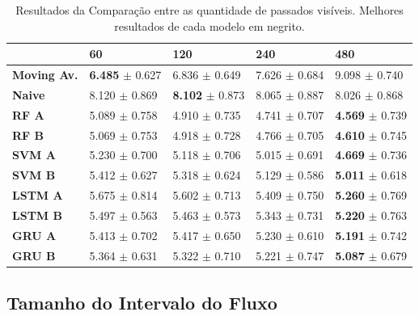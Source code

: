 \begin{table}[htbp]
    \begin{tabular*}{\linewidth}{@{\extracolsep{\fill}}lllll}
    \toprule
     & 
    \multicolumn{1}{l}{\textbf{60}} & 
    \multicolumn{1}{l}{\textbf{120}} &
    \multicolumn{1}{l}{\textbf{240}} &
    \multicolumn{1}{l}{\textbf{480}} \\
    \midrule
    \textbf{Moving Av.} & \textbf{6.485} $\pm$ 0.627 & 6.836 $\pm$ 0.649 & 7.626 $\pm$ 0.684 & 9.098 $\pm$ 0.740
    \\
    \midrule
    \textbf{Naive} & 8.120 $\pm$ 0.869 & \textbf{8.102} $\pm$ 0.873 & 8.065 $\pm$ 0.887 & 8.026 $\pm$ 0.868 
    \\
    \midrule
    \textbf{RF A} & 5.089 $\pm$ 0.758 & 4.910 $\pm$ 0.735 & 4.741 $\pm$ 0.707 & \textbf{4.569} $\pm$ 0.739 
    \\
    \midrule
    \textbf{RF B} & 5.069 $\pm$ 0.753 & 4.918 $\pm$ 0.728 & 4.766 $\pm$ 0.705 & \textbf{4.610} $\pm$ 0.745 
    \\
    \midrule
    \textbf{SVM A} & 5.230 $\pm$ 0.700 & 5.118 $\pm$ 0.706 & 5.015 $\pm$ 0.691 & \textbf{4.669} $\pm$ 0.736 
    \\
    \midrule
    \textbf{SVM B} & 5.412 $\pm$ 0.627 & 5.318 $\pm$ 0.624 & 5.129 $\pm$ 0.586 & \textbf{5.011} $\pm$ 0.618 
    \\
    \midrule
    \textbf{LSTM A} & 5.675 $\pm$ 0.814 & 5.602 $\pm$ 0.713 & 5.409 $\pm$ 0.750 & \textbf{5.260} $\pm$ 0.769 
    \\
    \midrule
    \textbf{LSTM B} & 5.497 $\pm$ 0.563 & 5.463 $\pm$ 0.573 & 5.343 $\pm$ 0.731 & \textbf{5.220} $\pm$ 0.763 
    \\
    \midrule
    \textbf{GRU A} & 5.413 $\pm$ 0.702 & 5.417 $\pm$ 0.650 & 5.230 $\pm$ 0.610 & \textbf{5.191} $\pm$ 0.742 
    \\
    \midrule
    \textbf{GRU B} & 5.364 $\pm$ 0.631 & 5.322 $\pm$ 0.710 & 5.221 $\pm$ 0.747 & \textbf{5.087} $\pm$ 0.679
    \\
    \bottomrule
    \end{tabular*}
    \label{table:res_past}
    \caption{Resultados da Comparação entre as quantidade de passados visíveis. Melhores resultados de cada modelo em negrito.}
\end{table}
 
\subsection{Tamanho do Intervalo do Fluxo}

